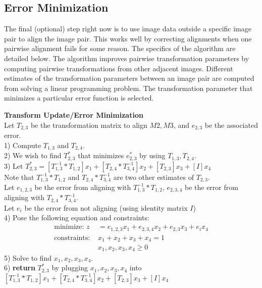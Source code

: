 \documentclass{article}
\begin{document}
\subsection{Error Minimization}
The final (optional) step right now is to use image data outside a specific image pair to align the image pair. This works well by correcting alignments when one pairwise alignment fails for some reason. The specifics of the algorithm are detailed below. The algorithm improves pairwise transformation parameters by computing pairwise transformations from other adjacent images. Different estimates of the transformation parameters between an image pair are computed from solving a linear programming problem. The transformation parameter that minimizes a particular error function is selected.
	\begin{algorithm}
	\DontPrintSemicolon
	\textbf{Transform Update/Error Minimization}\\
	Let $T_{2,3}$ be the transformation matrix to align $M2, M3$, and $e_{2,3}$ be the associated error.\\
	1) Compute $T_{1,3}$ and $T_{2,4}$.\\
	2) We wish to find $T_{2,3}^{*}$ that minimizes $e_{2,3}^{*}$ by using $T_{1,3},T_{2,4}$.\\
	3) Let $T_{2,3}^{*} = [T_{1,3}^{-1}*T_{1,2}]x_1 + [T_{2,4}*T_{3,4}^{-1}]x_2 + [T_{2,3}]x_3 + [I]x_4$\\
	Note that $T_{1,3}^{-1}*T_{1,2}$ and $T_{2,4}*T_{3,4}^{-1}$ are two other estimates of $T_{2,3}$.\\
	Let $e_{1,2,3}$ be the error from aligning with $T_{1,3}^{-1}*T_{1,2}$, $e_{2,3,4}$ be the error from aligning with $T_{2,4}*T_{3,4}^{-1}$.\\
	Let $e_i$ be the error from not aligning (using identity matrix $I$) \\
 	4) Pose the following equation and constraints:
	\begin{align*}
	 \text{minimize: } z &= e_{1,2,3}x_1 +  e_{2,3,4}x_2 + e_{2,3}x_3 + e_ix_4\\
	 \text{constraints: }&x_1 + x_2 + x_3 + x_4 = 1\\
	 &x_1, x_2, x_3, x_4 \ge 0
	\end{align*}
	5) Solve to find $x_1, x_2, x_3, x_4$.\\
	6) \textbf{return} $T_{2,3}^{*}$ by plugging $x_1, x_2, x_3, x_4$ into $[T_{1,3}^{-1}*T_{1,2}]x_1 + [T_{2,4}*T_{3,4}^{-1}]x_2 + [T_{2,3}]x_3 + [I]x_4$
	\end{algorithm}\\
\end{document}
